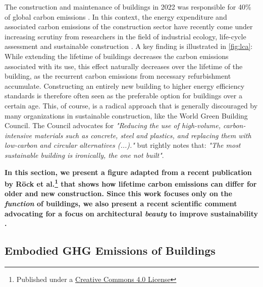 \documentclass[a4paper]{article}
\begin{document}
\begin{mdframed}[linewidth=1pt, roundcorner=5pt, innerleftmargin=10pt, innerrightmargin=10pt, innertopmargin=10pt, innerbottommargin=10pt, linecolor=black, backgroundcolor=white, userdefinedwidth=\textwidth]
    The construction and maintenance of buildings in 2022 was responsible for 40\% of global carbon emissions \cite{camarasa_energy_2023}. In this context, the energy expenditure and associated carbon emissions of the construction sector have recently come under increasing scrutiny from researchers in the field of industrial ecology, life-cycle assessment and sustainable construction \cite{chau_review_2015}\cite{ortiz_sustainability_2009}. A key finding is illustrated in \cref{fig:lca}: While extending the lifetime of buildings decreases the carbon emissions associated with its use, this effect naturally decreases over the lifetime of the building, as the recurrent carbon emissions from necessary refurbishment accumulate. Constructing an entirely new building to higher energy efficiency standards is therefore often seen as the preferable option for buildings over a certain age. This, of course, is a radical approach that is generally discouraged by many organizations in sustainable construction, like the World Green Building Council. The Council advocates for \textit{"Reducing the use of high-volume, carbon-intensive materials such as concrete, steel and plastics, and replacing them with low-carbon and circular alternatives (...)."} \cite[Sec. 7.4]{noauthor_2022_2022} but rightly notes that: \textit{"The most sustainable building is ironically, the one not built"}.
    
    \textbf{In this section, we present a figure adapted from a recent publication by Röck et al.\footnote{Published under a \href{https://creativecommons.org/licenses/by/4.0/}{Creative Commons 4.0 License}} \cite{rock_embodied_2020} that shows how lifetime carbon emissions can differ for older and new construction. Since this work focuses only on the \textit{function} of buildings, we also present a recent scientific comment advocating for a focus on architectural \textit{beauty} to improve sustainability \cite{piotrowski_focusing_2024}.}
\end{mdframed}

\subsection{Embodied GHG Emissions of Buildings}
\end{document}
